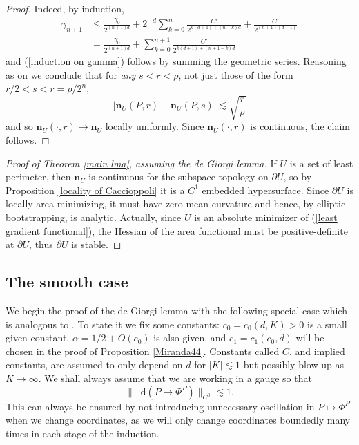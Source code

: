 \documentclass[final,12pt, leqno]{brownthesis}
\newcommand*\dif{\mathop{}\!\mathrm{d}}
\newcommand{\normal}{\mathbf n}
\theoremstyle{definition}
\numberwithin{equation}{section}
\begin{document}
\begin{proof}
Indeed, by induction,
\begin{align*}
\gamma_{n + 1}
&\leq \frac{\gamma_0}{2^{(n + 1)d}} + 2^{-d} \sum_{k=0}^n \frac{C'}{2^{k(d + 1) + (n - k)d}} + \frac{C'}{2^{(n + 1)(d + 1)}} \\
&= \frac{\gamma_0}{2^{(n + 1)d}} + \sum_{k=0}^{n + 1} \frac{C'}{2^{k(d + 1) + (n + 1 - k)d}}
\end{align*}
and (\ref{induction on gamma}) follows by summing the geometric series.
Reasoning as on \cite[pg100]{Giusti77} we conclude that for \emph{any} $s < r < \rho$, not just those of the form $r/2 < s < r = \rho/2^n$,
$$|\normal_U(P, r) - \normal_U(P, s)| \lesssim \sqrt{\frac{r}{\rho}}$$
and so $\normal_U(\cdot, r) \to \normal_U$ locally uniformly.
Since $\normal_U(\cdot, r)$ is continuous, the claim follows.
\end{proof}

\begin{proof}[Proof of Theorem \ref{main lma}, assuming the de Giorgi lemma]
If $U$ is a set of least perimeter, then $\normal_U$ is continuous for the subspace topology on $\partial U$, so by Proposition \ref{locality of Caccioppoli} it is a $C^1$ embedded hypersurface.
Since $\partial U$ is locally area minimizing, it must have zero mean curvature and hence, by elliptic bootstrapping, is analytic.
Actually, since $U$ is an absolute minimizer of (\ref{least gradient functional}), the Hessian of the area functional must be positive-definite at $\partial U$, thus $\partial U$ is stable.
\end{proof}


\subsection{The smooth case}
We begin the proof of the de Giorgi lemma with the following special case which is analogous to \cite[Lemma 6.4]{Giusti77}.
To state it we fix some constants: $c_0 = c_0(d, K) > 0$ is a small given constant, $\alpha = 1/2 + O(c_0)$ is also given, and $c_1 = c_1(c_0, d)$ will be chosen in the proof of Proposition \ref{Miranda44}.
Constants called $C$, and implied constants, are assumed to only depend on $d$ for $|K| \lesssim 1$ but possibly blow up as $K \to \infty$.
We shall always assume that we are working in a gauge so that
\begin{equation}\label{oscillation of isometries}
\|\dif(P \mapsto \Phi^P)\|_{C^0} \lesssim 1.
\end{equation}
This can always be ensured by not introducing unnecessary oscillation in $P \mapsto \Phi^P$ when we change coordinates, as we will only change coordinates boundedly many times in each stage of the induction.
\end{document}

